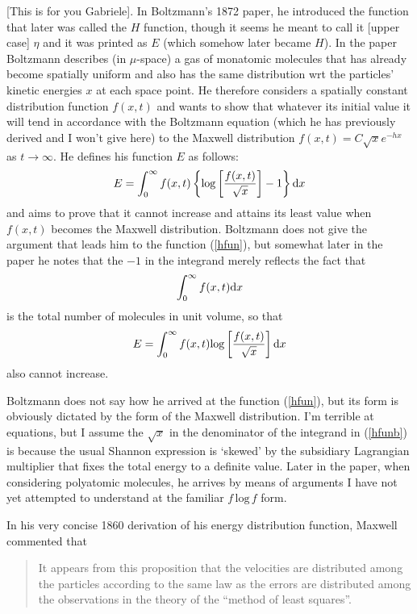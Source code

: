 \documentclass{article}
\begin{document}
[This is for you Gabriele]. In Boltzmann's 1872 paper, he introduced the function that later was called the $H$ function, though it seems he meant to call it [upper case] $\eta$ and it was printed as $E$ (which somehow later became $H$). In the paper Boltzmann describes (in $\mu$-space) a gas of monatomic molecules that has already become spatially uniform and also has the same distribution wrt the particles' kinetic energies $x$ at each space point. He therefore considers a spatially constant distribution function $f(x,t)$ and wants to show that whatever its initial value it will tend in accordance with the Boltzmann equation (which he has previously derived and I won't give here) to the Maxwell distribution $f(x,t)=C\sqrt xe^{-hx}$ as $t\rightarrow\infty$. He defines his function $E$ as follows:
\begin{equation}
E=\int_0^\infty f(x,t)\left\{\textrm{log}\left [{f(x,t)\over \sqrt x}\right ]-1\right\}\textrm dx\label{hfun}
\end{equation}
and aims to prove that it cannot increase and attains its least value when $f(x,t)$ becomes the Maxwell distribution. Boltzmann does not give the argument that leads him to the function (\ref{hfun}), but somewhat later in the paper he notes that the $-1$ in the integrand merely reflects the fact that
$$
\int_0^\infty f(x,t)\textrm dx
$$
is the total number of molecules in unit volume, so that 
\begin{equation}
E=\int_0^\infty f(x,t)\textrm{log}\left [{f(x,t)\over \sqrt x}\right ]\textrm dx\label{hfunb}
\end{equation}
also cannot increase.

Boltzmann does not say how he arrived at the function (\ref{hfun}), but its form is obviously dictated by the form of the Maxwell distribution. I'm terrible at equations, but I assume the $\sqrt x$ in the denominator of the integrand in (\ref{hfunb}) is because the usual Shannon expression is `skewed' by the subsidiary Lagrangian multiplier that fixes the total energy to a definite value. Later in the paper, when considering polyatomic molecules, he arrives by means of arguments I have not yet attempted to understand at the familiar $f\, \textrm{log}\,f$ form.

In his very concise 1860 derivation of his energy distribution function, Maxwell commented that

\begin{quote}\small

It appears from this proposition that the velocities are distributed among the particles according  to the same law as the errors are distributed among the observations in the theory of the ``method of least squares''.

\end{quote}\normalsize
\end{document}
